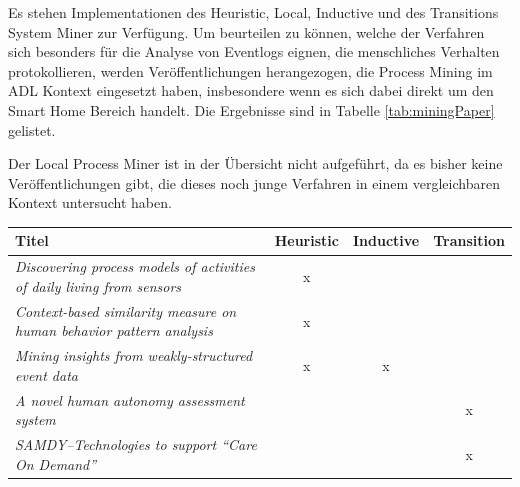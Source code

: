 Es stehen Implementationen des Heuristic, Local, Inductive und des Transitions System Miner zur Verfügung. Um beurteilen zu können, welche der Verfahren sich besonders für die Analyse von Eventlogs eignen, die menschliches Verhalten protokollieren, werden Veröffentlichungen herangezogen, die Process Mining im ADL Kontext eingesetzt haben, insbesondere wenn es sich dabei direkt um den Smart Home Bereich handelt. Die Ergebnisse sind in Tabelle \ref{tab:miningPaper} gelistet. 

Der Local Process Miner ist in der Übersicht nicht aufgeführt, da es bisher keine Veröffentlichungen gibt, die dieses noch junge Verfahren in einem vergleichbaren Kontext untersucht haben. 

\newcolumntype{b}{X}
\begin{table}[!ht]\small
\centering
\begin{tabularx}{\textwidth}{b ccc}
Titel                                                                                                               & \multicolumn{1}{l}{\textbf{Heuristic}} & \multicolumn{1}{l}{\textbf{Inductive}} & \multicolumn{1}{l}{\textbf{Transition}} \\ \hline\hline
\textit{Discovering process models of activities of daily living from sensors} \cite{adl1}                                      & x                                      &                                        &                                         \\
\textit{Context-based similarity measure on human behavior pattern analysis} \cite{adl2}                                        & x                                      &                                        &                                         \\
\textit{Mining insights from weakly-structured event data} \cite{adl3}                                                          & x                                      & x                                      &                                         \\
\textit{A novel human autonomy assessment system} \cite{adl4}                                                                   &                                        &                                        & x                                       \\
\textit{SAMDY–Technologies to support “Care On Demand”} \cite{adl5}                                                              &                                        &                                        & x                                       \\

\end{tabularx}
\end{table}
